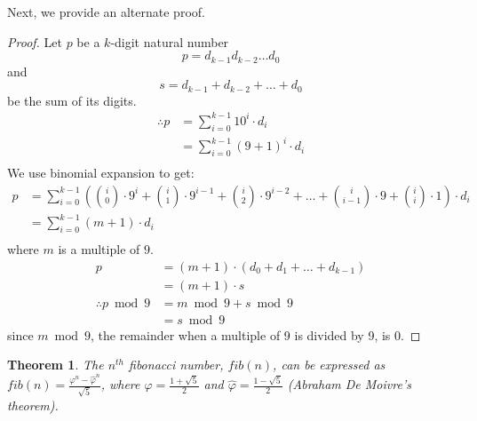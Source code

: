 \documentclass[a4paper]{article}
\renewcommand{\phi}{\varphi}
\newtheorem{theorem}{Theorem}
\begin{document}
Next, we provide an alternate proof.
\begin{proof}
    Let $p$ be a $k$-digit natural number
    $$
        p = d_{k-1}d_{k-2}\dots d_0
    $$
    and
    $$
        s = d_{k-1} + d_{k-2} + \dots + d_0
    $$
    be the sum of its digits.
    \begin{align*}
        \therefore p 
        &= \sum_{i=0}^{k-1}10^{i}\cdot d_i \\
        &= \sum_{i=0}^{k-1}(9+1)^i\cdot d_i \\
    \end{align*}
    We use binomial expansion to get:
    \begin{align*}
        p
        &= \sum_{i=0}^{k-1}({i \choose 0}\cdot 9^i + {i \choose 1}\cdot 9^{i-1} + {i \choose 2}\cdot 9^{i-2} + \dots + {i \choose i-1}\cdot 9 + {i \choose i}\cdot 1)\cdot d_i\\
        &= \sum_{i=0}^{k-1}(m + 1)\cdot d_i\\
    \end{align*}
    where $m$ is a multiple of $9$.
    \begin{align*}
        p
        &= (m + 1)\cdot (d_0 + d_1 + \dots + d_{k-1})\\
        &= (m + 1)\cdot s\\
        \therefore p \bmod 9 
        &= m \bmod 9 + s \bmod 9\\
        &= s \bmod 9
    \end{align*}
    since $m \bmod 9$, the remainder when a multiple of 9 is divided by 9, is $0$.
\end{proof}
\begin{theorem}
    \label{theorem: de-moivre-fib}
    The $n^{th}$ fibonacci number, $fib(n)$, can be expressed as \large{$fib(n)=\frac{\phi^n - \hat{\phi}^{n}}{\sqrt{5}}$},
    where $\phi = \frac{1+\sqrt{5}}{2}$ and $\hat{\phi} = \frac{1-\sqrt{5}}{2}$ (Abraham De Moivre's theorem).
\end{theorem}
\end{document}
